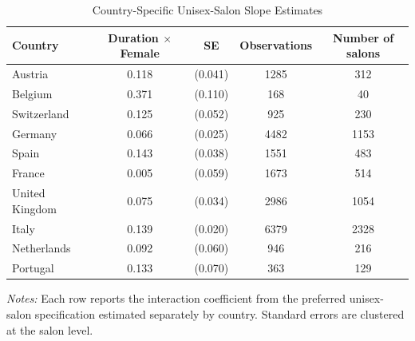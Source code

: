 \begin{table}[htbp]
  \centering
  \caption{Country-Specific Unisex-Salon Slope Estimates}
  \label{tab:country_heterogeneity}
  \small
  
\begin{tabular}{lcccc}
\hline
Country & Duration $\times$ Female & SE & Observations & Number of salons \\
\hline
Austria & 0.118 & (0.041) & 1285 & 312 \\
Belgium & 0.371 & (0.110) & 168 & 40 \\
Switzerland & 0.125 & (0.052) & 925 & 230 \\
Germany & 0.066 & (0.025) & 4482 & 1153 \\
Spain & 0.143 & (0.038) & 1551 & 483 \\
France & 0.005 & (0.059) & 1673 & 514 \\
United Kingdom & 0.075 & (0.034) & 2986 & 1054 \\
Italy & 0.139 & (0.020) & 6379 & 2328 \\
Netherlands & 0.092 & (0.060) & 946 & 216 \\
Portugal & 0.133 & (0.070) & 363 & 129 \\
\hline
\end{tabular}

\begin{minipage}{0.88\linewidth}
    \footnotesize
    \textit{Notes:} Each row reports the interaction coefficient from the preferred unisex-salon specification estimated separately by country.
    Standard errors are clustered at the salon level.
\end{minipage}
\end{table}
